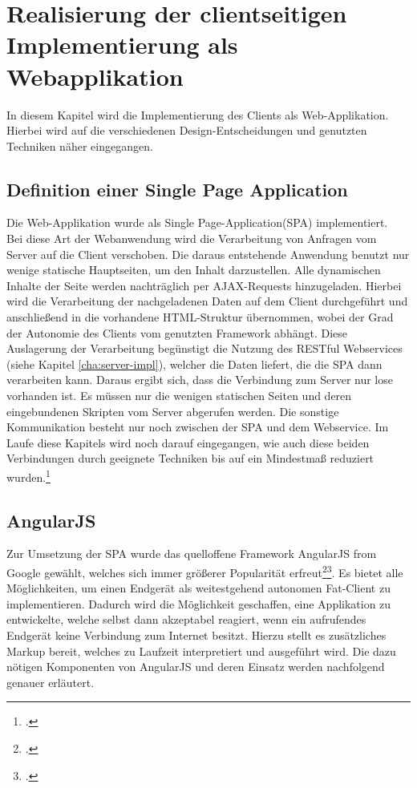 \chapter{Realisierung der clientseitigen Implementierung als Webapplikation}
\label{cha:web-app}
In diesem Kapitel wird die Implementierung des Clients als Web-Applikation. Hierbei wird auf die verschiedenen Design-Entscheidungen und genutzten Techniken näher eingegangen. 
\section{Definition einer Single Page Application}
\label{sec:Definition-SPA}
Die Web-Applikation wurde als \ac{Single Page-Application}(SPA) implementiert. \\Bei diese Art der Webanwendung wird die Verarbeitung von Anfragen vom Server auf die Client verschoben. Die daraus entstehende Anwendung benutzt nur wenige statische Hauptseiten, um den Inhalt darzustellen. Alle dynamischen Inhalte der Seite werden nachträglich per AJAX-Requests hinzugeladen.  Hierbei wird die Verarbeitung der nachgeladenen Daten auf dem Client durchgeführt und anschließend in die vorhandene HTML-Struktur übernommen, wobei der Grad der Autonomie des Clients vom genutzten Framework abhängt. Diese Auslagerung der Verarbeitung begünstigt die Nutzung des RESTful Webservices (siehe Kapitel \ref{cha:server-impl}), welcher die Daten liefert, die die SPA dann verarbeiten kann. Daraus ergibt sich, dass die Verbindung zum Server nur lose vorhanden ist. Es müssen nur  die wenigen statischen Seiten und deren eingebundenen Skripten vom Server abgerufen werden. Die sonstige Kommunikation besteht nur noch zwischen der SPA und dem Webservice. Im Laufe diese Kapitels wird noch darauf eingegangen, wie auch diese beiden Verbindungen durch geeignete Techniken bis auf ein Mindestmaß reduziert wurden.\footcite[S. 31f.]{book:AngularJs:Steyer2015}
\section{AngularJS}
\label{sec:AngularJS}
Zur Umsetzung der SPA wurde das quelloffene Framework AngularJS from Google gewählt, welches sich immer größerer Popularität erfreut\footcite{online:angularjs-popularity}\footcite[S. 33]{book:AngularJs:Steyer2015}. Es bietet alle Möglichkeiten, um einen Endgerät als weitestgehend autonomen \ac{Fat-Client} zu implementieren. Dadurch wird die Möglichkeit geschaffen, eine Applikation zu entwickelte, welche selbst dann akzeptabel reagiert, wenn ein aufrufendes Endgerät keine Verbindung zum Internet besitzt. Hierzu stellt es zusätzliches Markup bereit, welches zu Laufzeit interpretiert und ausgeführt wird. Die dazu nötigen Komponenten von AngularJS und deren Einsatz werden nachfolgend genauer erläutert.

